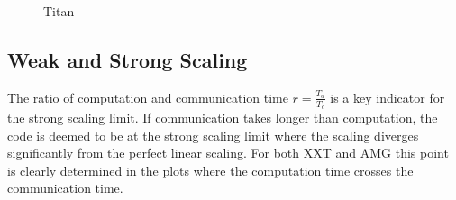 \documentclass{sig-alternate}
\begin{document}
\begin{figure}
{  }
\caption{Titan}
\label{fig:scaling_titan}
\end{figure}


\subsection{Weak and Strong Scaling}

The ratio of computation and communication time $r=\frac{T_a}{T_c}$ is a key
indicator for the strong scaling limit. If communication takes longer than
computation, the code is deemed to be at the strong scaling limit where the
scaling diverges significantly from the perfect linear scaling. For both XXT and
AMG this point is clearly determined in the plots where the computation time
crosses the communication time. 
\end{document}

